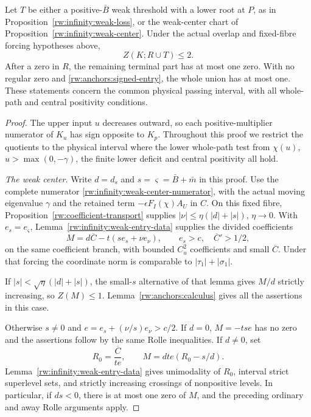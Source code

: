 \begin{proposition}
\label{rw:anchors:primary-weak}
Let $T$ be either a positive-$\bar B$ weak threshold with a lower
root at $P$, as in Proposition~\ref{rw:infinity:weak-loss}, or the weak-center chart of
Proposition~\ref{rw:infinity:weak-center}. Under the actual overlap
and fixed-fibre forcing hypotheses above,
\[
 Z(K;R\cup T)\le2.
\]
After a zero in $R$, the remaining terminal part has at most one zero.
With no regular zero and \eqref{rw:anchors:signed-entry}, the whole
union has at most one. These statements concern the common physical
passing interval, with all whole-path and central positivity conditions.
\end{proposition}
\begin{proof}
The upper input $u$ decreases outward, so each positive-multiplier
numerator of $K_u$ has sign opposite to $K_p$. Throughout this proof
we restrict the quotients to the physical interval where the lower
whole-path test from $\chi(u)$, $u>\max(0,-\gamma)$, the finite
lower deficit and central positivity all hold.

\textit{The weak center.}
Write $d=d_s$ and $s=\varsigma=\bar B+\bar m$ in this proof.
Use the complete numerator \eqref{rw:infinity:weak-center-numerator},
with the actual moving eigenvalue $\gamma$ and the retained term
$-\epsilon F_I(\chi)A_U$ in $C$. On this fixed fibre,
Proposition~\ref{rw:coefficient-transport} supplies
$|\nu|\le\eta(|d|+|s|)$, $\eta\to0$.
With $e_s=e_\varsigma$, Lemma~\ref{rw:infinity:weak-entry-data}
supplies the divided coefficients
\begin{equation}\label{rw:anchors:weak-columns}
 M=d\overline C-t(se_s+\nu e_\nu),\qquad
 e_s>c,\quad \overline C'>1/2,
\end{equation}
on the same coefficient branch, with bounded $C_u^2$ coefficients
and small $\overline C$. Under that forcing the coordinate norm is
comparable to $|\tau_1|+|\sigma_1|$.

If $|s|<\sqrt\eta(|d|+|s|)$, the small-$s$ alternative of that
lemma gives $M/d$ strictly increasing, so $Z(M)\le1$.
Lemma~\ref{rw:anchors:calculus} gives all the assertions in this case.

Otherwise $s\ne0$ and
$e=e_s+(\nu/s)e_\nu>c/2$. If $d=0$, $M=-tse$ has no zero and
the assertions follow by the same Rolle inequalities. If $d\ne0$, set
\[
 R_0=\frac{\overline C}{te},\qquad
 M=dte(R_0-s/d).
\]
Lemma~\ref{rw:infinity:weak-entry-data} gives unimodality of $R_0$,
interval strict superlevel sets, and strictly increasing crossings
of nonpositive levels. In particular,
if $ds<0$, there is at most one zero of $M$, and the preceding
ordinary and away Rolle arguments apply.


\end{proof}
